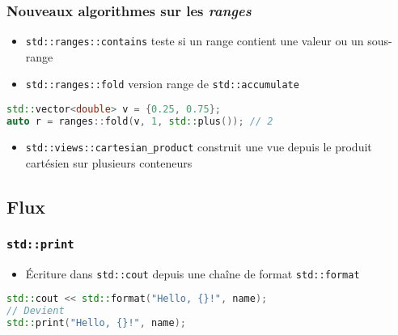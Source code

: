 \documentclass[C++.tex]{subfiles}
\begin{document}
\begin{frame}[fragile]
	\frametitle{Nouveaux algorithmes sur les \textit{ranges}}
	\begin{itemize}
		\item \lstinline|std::ranges::contains| teste si un range contient une valeur ou un sous-range
		\item \lstinline|std::ranges::fold| version range de \lstinline|std::accumulate|
	\end{itemize}

\begin{lstlisting}[language=C++]
std::vector<double> v = {0.25, 0.75};
auto r = ranges::fold(v, 1, std::plus()); // 2\end{lstlisting}

	\begin{itemize}
		\item \lstinline|std::views::cartesian_product| construit une vue depuis le produit cartésien sur plusieurs conteneurs
	\end{itemize}
\end{frame}

\subsection*{Flux}
\begin{frame}[fragile]
	\frametitle{\lstinline|std::print|}
	\begin{itemize}
		\item Écriture dans \lstinline|std::cout| depuis une chaîne de format \lstinline|std::format|
	\end{itemize}

	\begin{lstlisting}[language=C++]
std::cout << std::format("Hello, {}!", name);
// Devient
std::print("Hello, {}!", name);\end{lstlisting}
\end{frame}
\end{document}
